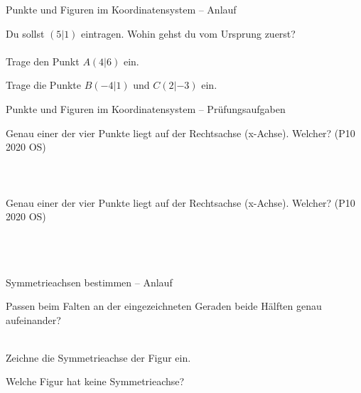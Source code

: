 \setcounter{aufgabe}{61}

\begin{aufgabe}{Punkte und Figuren im Koordinatensystem – Anlauf}
\begin{teile}
\teil Du sollst $(5|1)$ eintragen. Wohin gehst du vom Ursprung zuerst? \\  \\ 
\teil Trage den Punkt $A(4|6)$ ein.

\begin{ksys}[xmin=0,xmax=8,ymin=0,ymax=8] \end{ksys}
\teil Trage die Punkte $B(-4|1)$ und $C(2|-3)$ ein.

\begin{ksys}[xmin=-6,xmax=6,ymin=-6,ymax=6] \end{ksys}
\end{teile}
\end{aufgabe}

\begin{aufgabe}{Punkte und Figuren im Koordinatensystem – Prüfungsaufgaben}
\begin{teile}
\teil Genau einer der vier Punkte liegt auf der Rechtsachse (x-Achse). Welcher? \hfill (P10 2020 OS) \\  \\  \\  \\ 
\teil Genau einer der vier Punkte liegt auf der Rechtsachse (x-Achse). Welcher? \hfill (P10 2020 OS) \\  \\  \\  \\ 
\end{teile}
\end{aufgabe}

\begin{aufgabe}{Symmetrieachsen bestimmen – Anlauf}
\begin{teile}
\teil Passen beim Falten an der eingezeichneten Geraden beide Hälften genau aufeinander? \\  \\ 

\teil Zeichne die Symmetrieachse der Figur ein.

\teil Welche Figur hat keine Symmetrieachse? \\  \\  \\ 
\end{teile}
\end{aufgabe}


